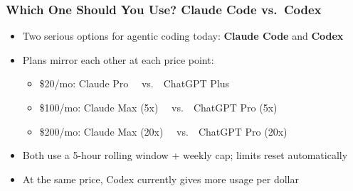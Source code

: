 \documentclass[aspectratio=169, 12pt]{beamer}
\begin{document}
\begin{frame}
\frametitle{Which One Should You Use? Claude Code vs.\ Codex}

\begin{itemize}
    \item Two serious options for agentic coding today: \textbf{Claude Code} and \textbf{Codex}
    \vspace{.05in}
    \item Plans mirror each other at each price point:
        \begin{itemize}
            \item[$\circ$] \$20/mo: Claude Pro \ \ vs.\ \ ChatGPT Plus
            \item[$\circ$] \$100/mo: Claude Max (5x) \ \ vs.\ \ ChatGPT Pro (5x)
            \item[$\circ$] \$200/mo: Claude Max (20x) \ \ vs.\ \ ChatGPT Pro (20x)
        \end{itemize}
    \vspace{.05in}
    \item Both use a 5-hour rolling window + weekly cap; limits reset automatically
    \vspace{.05in}
    \item At the same price, Codex currently gives more usage per dollar
\end{itemize}

\end{frame}
\end{document}

